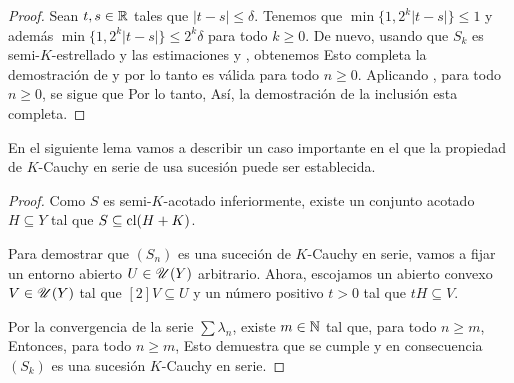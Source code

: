 \begin{proof}
	Sean $t,s\in\mathbb{R}$ tales que $|t-s|\leq\delta$. Tenemos que 
	$\min\big\{1,2^k|t-s|\big\}\leq 1$
	y adem\'as $\min\big\{1,2^k|t-s|\big\}\leq 2^{k}\delta$ para todo $k\geq0$.
	De nuevo, usando que $S_k$ es semi-$K$-estrellado y las estimaciones 
	 y , obtenemos 
	Esto completa la demostraci\'on de  y por lo tanto  es v\'alida 
	para todo $n\geq0$. Aplicando , para todo $n\geq 0$, se sigue que 
	Por lo tanto,
	As\'i, la demostraci\'on de la inclusi\'on  esta completa.
\end{proof}
			
En el siguiente lema vamos a describir un caso importante en el que la propiedad
de $K$-Cauchy en serie de usa sucesi\'on puede ser establecida.
			
\begin{proof} 
	Como $S$ es semi-$K$-acotado inferiormente, existe un conjunto acotado $H\subseteq Y$
	tal que $S\subseteq\mathop{\hbox{\rm cl}}\nolimits(H+K)$.
	
	Para demostrar que $(S_n)$ es una suceci\'on de $K$-Cauchy en serie,
	vamos a fijar un entorno abierto $U\in\mathscr{U}(Y)$ arbitrario.
	Ahora, escojamos un abierto convexo $V\in\mathscr{U}(Y)$ tal que $[2]V\subseteq U$
	y un n\'umero positivo $t>0$ tal que $tH\subseteq V$.
	
	Por la convergencia de la serie $\sum\lambda_n$, existe $m\in\mathbb{N}$ tal que,
	para todo $n\geq m$,
	Entonces, para todo $n\geq m$,
	Esto demuestra que  se cumple y en consecuencia $(S_k)$ es una sucesi\'on
	$K$-Cauchy en serie.
\end{proof}
				
